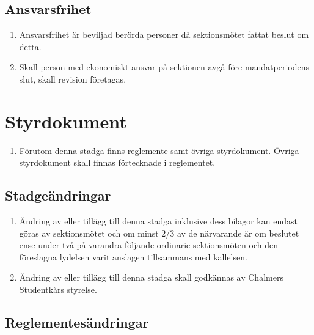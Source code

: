 \documentclass[11pt,a4paper]{article}
\begin{document}
\subsection{Ansvarsfrihet}
\begin{enumerate}[\thesubsection .1]

  \item Ansvarsfrihet är beviljad berörda personer då sektionsmötet
  fattat beslut om detta.

  \item Skall person med ekonomiskt ansvar på sektionen avgå
  före mandatperiodens slut, skall revision företagas.

\end{enumerate}

\newpage


\section{Styrdokument}
\begin{enumerate}[\thesubsection .1]

  \item Förutom denna stadga finns reglemente samt övriga styrdokument. Övriga styrdokument skall finnas förtecknade i reglementet.
  
\end{enumerate}

\subsection{Stadgeändringar}

\begin{enumerate}[\thesubsection .1]

  \item Ändring av eller tillägg till denna stadga inklusive dess
  bilagor kan endast göras av sektionsmötet och om minst 2/3 av de
  närvarande är om beslutet ense under två på varandra följande
  ordinarie sektionsmöten och den föreslagna lydelsen varit anslagen
  tillsammans med kallelsen.

  \item Ändring av eller tillägg till denna stadga skall godkännas av
   Chalmers Studentkårs styrelse.

\end{enumerate}

\subsection{Reglementesändringar}
\end{document}
